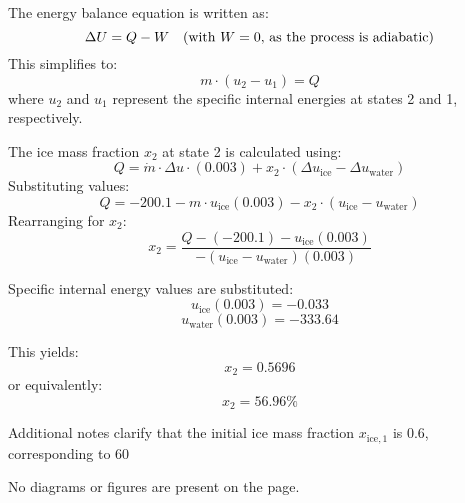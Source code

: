 The energy balance equation is written as:  
\[
\Delta U = Q - W \quad \text{(with \( W = 0 \), as the process is adiabatic)}  
\]  
This simplifies to:  
\[
m \cdot (u_2 - u_1) = Q  
\]  
where \( u_2 \) and \( u_1 \) represent the specific internal energies at states 2 and 1, respectively.  

The ice mass fraction \( x_2 \) at state 2 is calculated using:  
\[
Q = \dot{m} \cdot \Delta u \cdot (0.003) + x_2 \cdot (\Delta u_{\text{ice}} - \Delta u_{\text{water}})  
\]  
Substituting values:  
\[
Q = -200.1 - m \cdot u_{\text{ice}}(0.003) - x_2 \cdot (u_{\text{ice}} - u_{\text{water}})  
\]  
Rearranging for \( x_2 \):  
\[
x_2 = \frac{Q - (-200.1) - u_{\text{ice}}(0.003)}{- (u_{\text{ice}} - u_{\text{water}})(0.003)}  
\]  

Specific internal energy values are substituted:  
\[
u_{\text{ice}}(0.003) = -0.033  
\]  
\[
u_{\text{water}}(0.003) = -333.64  
\]  

This yields:  
\[
x_2 = 0.5696  
\]  
or equivalently:  
\[
x_2 = 56.96\%  
\]  

Additional notes clarify that the initial ice mass fraction \( x_{\text{ice},1} \) is 0.6, corresponding to 60%

No diagrams or figures are present on the page.
